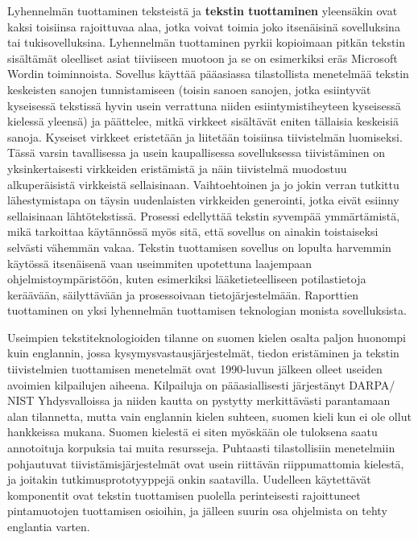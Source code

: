 \begin{multicols}{2}
Lyhennelmän tuottaminen teksteistä ja \textbf{tekstin tuottaminen} yleensäkin ovat kaksi toisiinsa rajoittuvaa alaa, jotka voivat toimia joko itsenäisinä sovelluksina tai tukisovelluksina. Lyhennelmän tuottaminen pyrkii kopioimaan pitkän tekstin sisältämät oleelliset asiat tiiviiseen muotoon ja se on esimerkiksi eräs Microsoft Wordin toiminnoista. Sovellus käyttää pääasiassa tilastollista menetelmää tekstin keskeisten sanojen tunnistamiseen (toisin sanoen sanojen, jotka esiintyvät kyseisessä tekstissä hyvin usein verrattuna niiden esiintymistiheyteen kyseisessä kielessä yleensä) ja päättelee, mitkä virkkeet sisältävät eniten tällaisia keskeisiä sanoja. Kyseiset virkkeet eristetään ja liitetään toisiinsa tiivistelmän luomiseksi. Tässä varsin tavallisessa ja usein kaupallisessa sovelluksessa tiivistäminen on yksinkertaisesti virkkeiden eristämistä ja näin tiivistelmä muodostuu alkuperäisistä virkkeistä sellaisinaan. Vaihtoehtoinen ja jo jokin verran tutkittu lähestymistapa on täysin uudenlaisten virkkeiden generointi, jotka eivät esiinny sellaisinaan lähtötekstissä. Prosessi edellyttää tekstin syvempää ymmärtämistä, mikä tarkoittaa käytännössä myös sitä, että sovellus on ainakin toistaiseksi selvästi vähemmän vakaa. Tekstin tuottamisen sovellus on lopulta harvemmin käytössä itsenäisenä vaan useimmiten upotettuna laajempaan ohjelmistoympäristöön, kuten esimerkiksi lääketieteelliseen potilastietoja keräävään, säilyttävään ja prosessoivaan tietojärjestelmään. Raporttien tuottaminen on yksi lyhennelmän tuottamisen teknologian monista sovelluksista.


Useimpien tekstiteknologioiden tilanne on suomen kielen osalta paljon huonompi kuin englannin, jossa kysymysvastausjärjestelmät, tiedon eristäminen ja tekstin tiivistelmien tuottamisen menetelmät ovat 1990-luvun jälkeen olleet useiden avoimien kilpailujen aiheena. Kilpailuja on pääasiallisesti järjestänyt DARPA/ NIST Yhdysvalloissa ja niiden kautta on pystytty merkittävästi parantamaan alan tilannetta, mutta vain englannin kielen suhteen, suomen kieli kun ei ole ollut hankkeissa mukana. Suomen kielestä ei siten myöskään ole tuloksena saatu annotoituja korpuksia tai muita resursseja. Puhtaasti tilastollisiin menetelmiin pohjautuvat tiivistämisjärjestelmät ovat usein riittävän riippumattomia kielestä, ja joitakin tutkimusprototyyppejä onkin saatavilla. Uudelleen käytettävät komponentit ovat tekstin tuottamisen puolella perinteisesti rajoittuneet pintamuotojen tuottamisen osioihin, ja jälleen suurin osa ohjelmista on tehty englantia varten.


\end{multicols}
